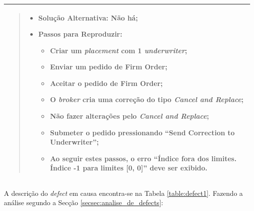 \begin{table}[htbp]
\begin{tabularx}{1\textwidth}{|>{\raggedright\arraybackslash}X|}
\begin{quote}
\begin{itemize}
                            \item Solução Alternativa: Não há;

                            \item Passos para Reproduzir:
                            \begin{itemize}
                                \item Criar um \textit{placement} com 1 \textit{underwriter};

                                \item Enviar um pedido de Firm Order;

                                \item Aceitar o pedido de Firm Order;

                                \item O \textit{broker} cria uma correção do tipo \textit{Cancel and Replace};

                                \item Não fazer alterações pelo \textit{Cancel and Replace};

                                \item Submeter o pedido pressionando ``Send Correction to Underwriter'';

                                \item Ao seguir estes passos, o erro ``Índice fora dos limites. Índice -1 para limites [0, 0]'' deve ser exibido.
                            \end{itemize}
                        \end{itemize}
                    \end{quote}

                    \\
                    \hline
                \end{tabularx}
              \end{table}


                A descrição do \textit{defect} em causa encontra-se na Tabela \ref{table:defect1}. Fazendo a análise segundo a Secção \ref{secsec:analise_de_defects}:

